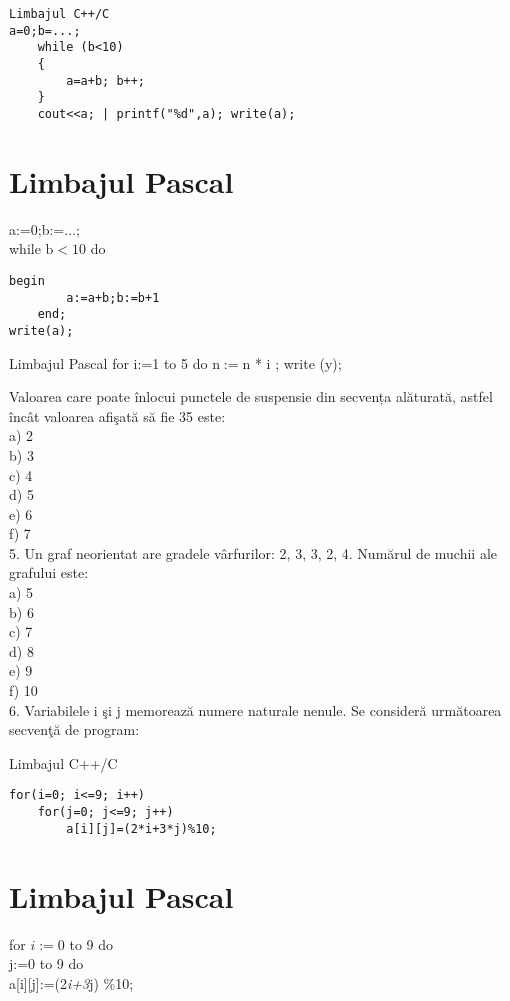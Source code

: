 \begin{verbatim}
Limbajul C++/C
a=0;b=...;
    while (b<10)
    {
        a=a+b; b++;
    }
    cout<<a; | printf("%d",a); write(a);
\end{verbatim}

\section*{Limbajul Pascal}
a:=0;b:=...;\\
while $\mathrm{b}<10$ do

\begin{verbatim}
begin
        a:=a+b;b:=b+1
    end;
write(a);
\end{verbatim}

Limbajul Pascal for i:=1 to 5 do $\mathrm{n}:=\mathrm{n}$ * i ; write (y);

Valoarea care poate înlocui punctele de suspensie din secvența alăturată, astfel încât valoarea afişată să fie 35 este:\\
a) 2\\
b) 3\\
c) 4\\
d) 5\\
e) 6\\
f) 7\\
5. Un graf neorientat are gradele vârfurilor: 2, 3, 3, 2, 4. Numărul de muchii ale grafului este:\\
a) 5\\
b) 6\\
c) 7\\
d) 8\\
e) 9\\
f) 10\\
6. Variabilele i şi j memorează numere naturale nenule. Se consideră următoarea secvenţă de program:

Limbajul C++/C

\begin{verbatim}
for(i=0; i<=9; i++)
    for(j=0; j<=9; j++)
        a[i][j]=(2*i+3*j)%10;
\end{verbatim}

\section*{Limbajul Pascal}
\begin{displayquote}
for $i:=0$ to 9 do\\
j:=0 to 9 do\\[0pt]
a[i][j]:=(2\textit{i+3}j) \%10;
\end{displayquote}

